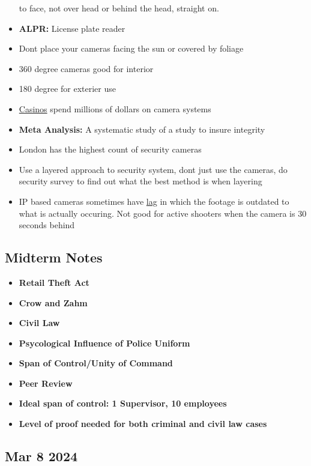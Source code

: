 \documentclass[12pt]{article}
\begin{document}
\begin{itemize}
				to face, not over head or behind the head, straight on.
			\item \textbf{ALPR:} License plate reader
			\item Dont place your cameras facing the sun or covered by foliage
			\item 360 degree cameras good for interior
			\item 180 degree for exterier use
			\item \underline{Casinos} spend millions of dollars on camera systems
			\item \textbf{Meta Analysis:} A systematic study of a study to insure integrity
			\item London has the highest count of security cameras
			\item Use a layered approach to security system, dont just use the cameras, do security survey to
				find out what the best method is when layering
			\item IP based cameras sometimes have \underline{lag} in which the footage is outdated to what is
				actually occuring. Not good for active shooters when the camera is 30 seconds behind

\end{itemize}

\subsection*{Midterm Notes}

\begin{itemize}
		  \item \textbf{Retail Theft Act}  
		  \item \textbf{Crow and Zahm}  
		  \item \textbf{Civil Law}  
		  \item \textbf{Psycological Influence of Police Uniform}  
		  \item \textbf{Span of Control/Unity of Command}  
		  \item \textbf{Peer Review}  
		  \item \textbf{Ideal span of control: 1 Supervisor, 10 employees}  
		  \item \textbf{Level of proof needed for both criminal and civil law cases}  
\end{itemize}

\subsection*{Mar 8 2024}
\end{document}
